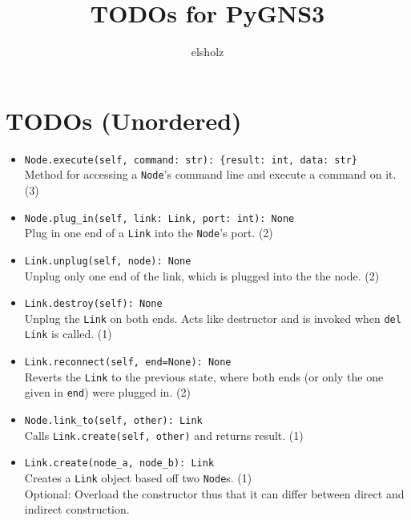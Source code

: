 \documentclass[a4paper,10pt]{article}
\begin{document}
\title{TODOs for PyGNS3}
\author{elsholz}
\maketitle
\def\code#1{\texttt{#1}}

\section{TODOs (Unordered)}
\begin{itemize}
\item  \code{Node.execute(self, command: str): \{result: int, data: str\}} \\
Method for accessing a \code{Node}'s command line and execute a command on it. (3)
\item \code{Node.plug\_in(self, link: Link, port: int): None}\\
Plug in one end of a \code{Link} into the \code{Node}'s port. (2)
\item \code{Link.unplug(self, node): None}\\
Unplug only one end of the link, which is plugged into the the node. (2)
\item \code{Link.destroy(self): None}\\
Unplug the \code{Link} on both ends. Acts like destructor and is invoked when \code{del Link} is called. (1)
\item \code{Link.reconnect(self, end=None): None}\\
Reverts the \code{Link} to the previous state, where both ends (or only the one given in \code{end}) were plugged in.  (2)
\item \code{Node.link\_to(self, other): Link}\\
Calls \code{Link.create(self, other)} and returns result.  (1)
\item \code{Link.create(node\_a, node\_b): Link}\\ 
Creates a \code{Link} object based off two \code{Node}s. (1) \\
Optional: Overload the constructor thus that it can differ between direct and indirect construction.
\end{itemize}
\end{document}
